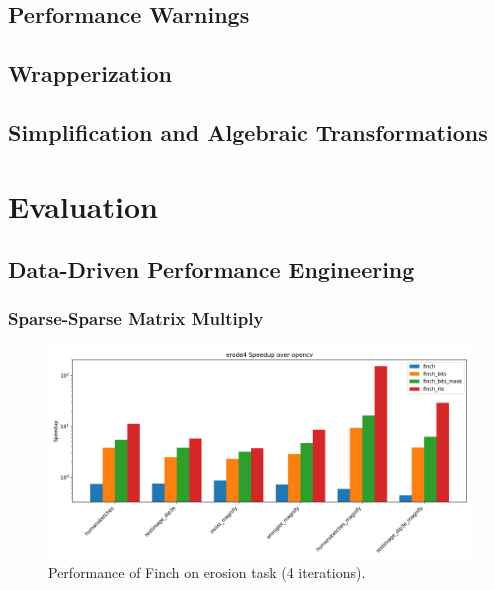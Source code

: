 \documentclass[acmsmall]{acmart}
\begin{document}
\subsection{Performance Warnings}

\subsection{Wrapperization}

\subsection{Simplification and Algebraic Transformations}


\section{Evaluation}

\subsection{Data-Driven Performance Engineering}
\subsubsection{Sparse-Sparse Matrix Multiply}


\begin{figure}
	\includegraphics[width=\linewidth]{erode4_speedup_over_opencv.png}
    \caption{Performance of Finch on erosion task (4 iterations).}
\end{figure}
\end{document}
